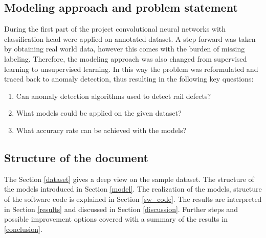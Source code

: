 \subsection{Modeling approach and problem statement}
During the first part of the project convolutional neural networks with classification head were applied
on annotated dataset.
A step forward was taken by obtaining real world data, however this comes with the burden of
missing labeling.
Therefore, the modeling approach was also changed from supervised learning to unsupervised learning.
In this way the problem was reformulated and traced back to anomaly detection, thus resulting in the
following key questions:

\begin{enumerate}[label=Q\arabic*]
    \item \label{itm:Q1} Can anomaly detection algorithms used to detect rail defects?
    \item \label{itm:Q2} What models could be applied on the given dataset?
    \item \label{itm:Q3} What accuracy rate can be achieved with the models?
\end{enumerate}

\subsection{Structure of the document}
The Section \ref{dataset} gives a deep view on the sample dataset.
The structure of the models introduced in Section \ref{model}.
The realization of the models, structure of the software code is explained in Section \ref{sw_code}.
The results are interpreted in Section \ref{results} and discussed in Section \ref{discussion}.
Further steps and possible improvement options covered with a summary of the results in \ref{conclusion}.